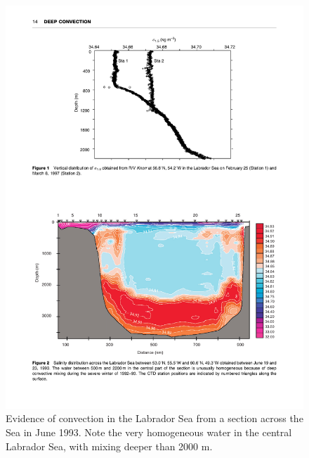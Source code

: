 \begin{figure}[hbt]
  \begin{center}
    \includegraphics{figs/WaterMasses/Lazier01Fig9}
    \caption{Evidence of convection in the Labrador Sea from a section across the Sea in June 1993.  Note the very homogeneous water in the central Labrador Sea, with mixing deeper than 2000 m.  }
    \label{fig:Lazier01Fig9}  
  \end{center}
\end{figure}


